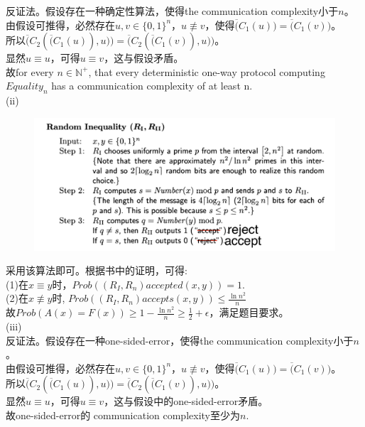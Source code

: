 \documentclass[a4paper, justified]{tufte-handout}
\begin{document}
\begin{solution}
  反证法。假设存在一种确定性算法，使得the communication complexity小于$n$。\\
  由假设可推得，必然存在$u,v\in\{0,1\}^{n}$，$u\not\equiv v$，使得$\overline(C_1(u))=\overline(C_1(v))$。\\
  所以$\overline(C_2(\overline(C_1(u)),u))=\overline(C_2(\overline(C_1(v)),u))$。\\
  显然$u\equiv u$，可得$u \equiv v$，这与假设矛盾。\\
  故for every $n\in \mathbb{N}^{+}$, that every deterministic one-way protocol computing $Equality_n$ has a communication complexity of at least n.\\
  (ii)\\
  \begin{figure}[htbp]
    \centering
    \includegraphics[width = 0.90\linewidth]{figs/a}
  \end{figure}


  采用该算法即可。根据书中的证明，可得:\\
  (1)在$x\equiv y$时，$Prob((R_I,R_n) accepted (x,y)) = 1$.\\
  (2)在$x\not\equiv y$时, $Prob((R_I,R_n) accepts (x,y))\leq \frac{\ln n^2}{n}$\\
  故$Prob(A(x)=F(x)) \geq 1-\frac{\ln n^2}{n}\geq \frac{1}{2}+\epsilon$，满足题目要求。\\
  (iii)\\
  反证法。假设存在一种one-sided-error，使得the communication complexity小于$n$。\\
  由假设可推得，必然存在$u,v\in\{0,1\}^{n}$，$u\not\equiv v$，使得$\overline(C_1(u))=\overline(C_1(v))$。\\
  所以$\overline(C_2(\overline(C_1(u)),u))=\overline(C_2(\overline(C_1(v)),u))$。\\
  显然$u\equiv u$，可得$u \equiv v$，这与假设中的one-sided-error矛盾。\\
  故one-sided-error的 communication complexity至少为$n$.\\
\end{solution}
\end{document}
